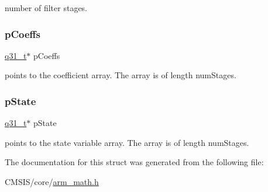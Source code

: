 number of filter stages. \mbox{\label{structarm__fir__lattice__instance__q31_a68888e36167d81cb7836db10367a1682}} 
\subsubsection{\texorpdfstring{pCoeffs}{pCoeffs}}
{\footnotesize\ttfamily \mbox{\hyperlink{arm__math_8h_adc89a3547f5324b7b3b95adec3806bc0}{q31\+\_\+t}}$\ast$ p\+Coeffs}

points to the coefficient array. The array is of length num\+Stages. \mbox{\label{structarm__fir__lattice__instance__q31_adee4ba3ee8869865af7d8fa08ca913d6}} 
\subsubsection{\texorpdfstring{pState}{pState}}
{\footnotesize\ttfamily \mbox{\hyperlink{arm__math_8h_adc89a3547f5324b7b3b95adec3806bc0}{q31\+\_\+t}}$\ast$ p\+State}

points to the state variable array. The array is of length num\+Stages. 

The documentation for this struct was generated from the following file\+:\begin{DoxyCompactItemize}
\item 
C\+M\+S\+I\+S/core/\mbox{\hyperlink{arm__math_8h}{arm\+\_\+math.\+h}}\end{DoxyCompactItemize}
